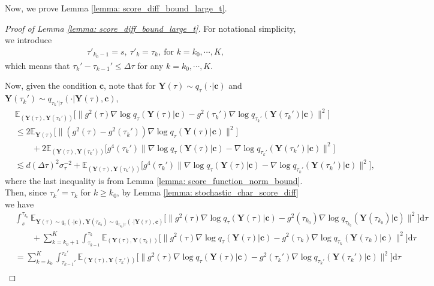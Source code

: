 \documentclass[11pt]{article}
\newcommand{\mE}{\mathbb{E}}
\newcommand{\bY}{\mathbf{Y}}
\newcommand{\bc}{\mathbf{c}}
\newcommand{\intd}{\mathrm{d}}
\begin{document}
Now, we prove Lemma \ref{lemma: score_diff_bound_large_t}.

\begin{proof}[Proof of Lemma \ref{lemma: score_diff_bound_large_t}]
For notational simplicity, we introduce
\begin{align*}
    \tau'_{k_0 - 1} = s,\ \tau'_{k} = \tau_k,\ \text{for }k=k_0, \cdots, K,
\end{align*}
which means that $\tau_{k}' - \tau_{k - 1}' \le \Delta\tau$ for any $k=k_0, \cdots, K$.

Now, given the condition $\bc$, note that for $\bY(\tau)\sim q_\tau(\cdot | \bc)$ and $\bY(\tau_k')\sim q_{\tau_k' | \tau}(\cdot | \bY(\tau), \bc)$,
\begin{align*}
    & \mE_{(\bY(\tau), \bY(\tau_k'))} \big[\|g^2(\tau)\nabla\log q_\tau(\bY(\tau) | \bc) - g^2(\tau_k')\nabla\log q_{\tau_k'}(\bY(\tau_k') | \bc)\|^2\big]\\
    &\le 2\mE_{\bY(\tau)}\big[\|(g^2(\tau) - g^2(\tau_k'))\nabla\log q_\tau(\bY(\tau) | \bc)\|^2]\\
    &\qquad  + 2\mE_{(\bY(\tau), \bY(\tau_k'))} \big[g^4(\tau_k')\|\nabla\log q_\tau(\bY(\tau) | \bc) - \nabla\log q_{\tau_k'}(\bY(\tau_k') | \bc)\|^2\big]\\
    &\lesssim d(\Delta\tau)^2\sigma_\tau^{-2} +  \mE_{(\bY(\tau), \bY(\tau_k'))} \big[g^4(\tau_k')\|\nabla\log q_\tau(\bY(\tau) | \bc) - \nabla\log q_{\tau_k'}(\bY(\tau_k') | \bc)\|^2\big],
\end{align*}
where the last inequality is from Lemma \ref{lemma: score_function_norm_bound}. Then, since $\tau_k' = \tau_k$ for $k\ge k_0$, by Lemma \ref{lemma: stochastic_char_score_diff} we have
\begin{align}
    & \int_{s}^{\tau_{k_0}}\mE_{\bY(\tau)\sim q_\tau(\cdot | \bc), \bY(\tau_{k_0})\sim q_{\tau_{k_0} | \tau}(\cdot | \bY(\tau), \bc)}\big[\|g^2(\tau)\nabla\log q_{\tau}(\bY(\tau) | \bc) - g^2(\tau_{k_0})\nabla\log q_{\tau_{k_0}}(\bY(\tau_{k_0}) | \bc ) \|^2\big] \intd\tau\nonumber\\
    &\qquad + \sum_{k=k_0 + 1}^{K}\int_{\tau_{k - 1}}^{\tau_k}\mE_{(\bY(\tau), \bY(\tau_k))}\big[\|g^2(\tau)\nabla\log q_\tau(\bY(\tau) | \bc) - g^2(\tau_k)\nabla\log q_{\tau_k}(\bY(\tau_k) | \bc)\|^2\big]\intd \tau \nonumber\\
    &=\sum_{k=k_0}^{K}\int_{\tau_{k - 1}'}^{\tau_k'}\mE_{(\bY(\tau), \bY(\tau_k'))}\big[\|g^2(\tau)\nabla\log q_\tau(\bY(\tau) | \bc) - g^2(\tau_k')\nabla\log q_{\tau_k'}(\bY(\tau_k') | \bc)\|^2\big]\intd \tau \nonumber\\

\end{align}
\end{proof}
\end{document}
